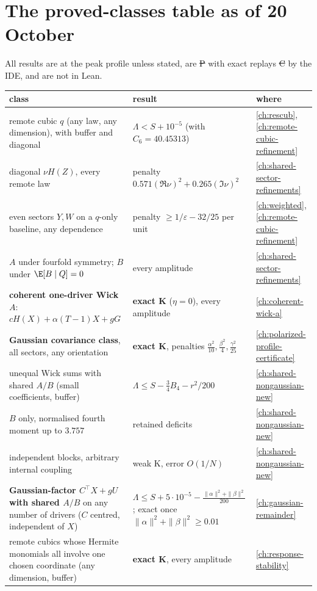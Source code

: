 \section{The proved-classes table as of 20 October}
All results are at the peak profile unless stated, are \st{P} with exact replays \st{C} by the IDE, and are not in Lean.
\begin{center}\small
\begin{tabular}{p{6.2cm}p{4.6cm}p{2.6cm}}\toprule
class & result & where\\\midrule
remote cubic $q$ (any law, any dimension), with buffer and diagonal & $\Lambda<S+10^{-5}$ (with $C_6=40.45313$) & \autoref{ch:rescub}, \autoref{ch:remote-cubic-refinement}\\
diagonal $\nu H(Z)$, every remote law & penalty $0.571(\Re\nu)^2+0.265(\Im\nu)^2$ & \autoref{ch:shared-sector-refinements}\\
even sectors $Y,W$ on a $q$-only baseline, any dependence & penalty $\ge1/\varepsilon-32/25$ per unit & \autoref{ch:weighted}, \autoref{ch:remote-cubic-refinement}\\
$A$ under fourfold symmetry; $B$ under $\E[B\mid Q]=0$ & every amplitude & \autoref{ch:shared-sector-refinements}\\
\textbf{coherent one-driver Wick $A$}: $cH(X)+\alpha(T-1)X+gG$ & \textbf{exact K} ($\eta=0$), every amplitude & \autoref{ch:coherent-wick-a}\\
\textbf{Gaussian covariance class}, all sectors, any orientation & \textbf{exact K}, penalties $\tfrac{\alpha^2}{10},\tfrac{\beta^2}4,\tfrac{\gamma^2}{25}$ & \autoref{ch:polarized-profile-certificate}\\
unequal Wick sums with shared $A/B$ (small coefficients, buffer) & $\Lambda\le S-\tfrac34B_4-r^2/200$ & \autoref{ch:shared-nongaussian-new}\\
$B$ only, normalised fourth moment up to $3.757$ & retained deficits & \autoref{ch:shared-nongaussian-new}\\
independent blocks, arbitrary internal coupling & weak K, error $O(1/N)$ & \autoref{ch:shared-nongaussian-new}\\
\textbf{Gaussian-factor $C^{\!\top}\!X+gU$ with shared $A/B$} on any number of drivers ($C$ centred, independent of $X$) & $\Lambda\le S+5\cdot10^{-5}-\tfrac{\|\alpha\|^2+\|\beta\|^2}{200}$; exact once $\|\alpha\|^2+\|\beta\|^2\ge0.01$ & \autoref{ch:gaussian-remainder}\\
remote cubics whose Hermite monomials all involve one chosen coordinate (any dimension, buffer) & \textbf{exact K}, every amplitude & \autoref{ch:response-stability}\\

\end{tabular}
\end{center}
